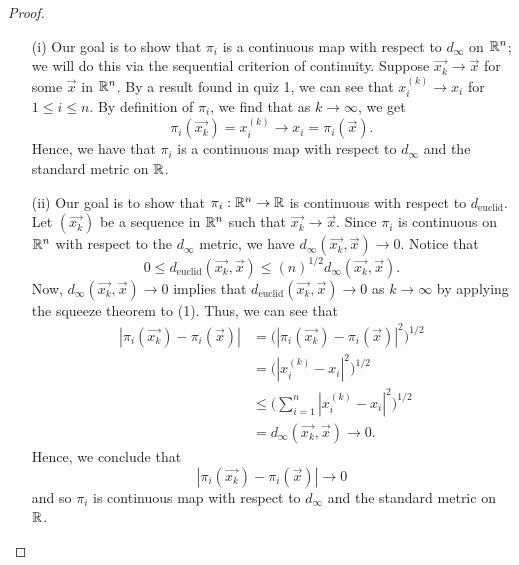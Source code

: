 \documentclass[a4paper]{article}
\begin{document}
\begin{proof}
\begin{enumerate}
    \item[(i)] Our goal is to show that \( {\pi}_{i} \) is a continuous map with respect to \( {d}_{\infty } \) on \( \mathbb{R}^{n} \); we will do this via the sequential criterion of continuity. Suppose \( \vec{ {x}_{k} }  \to \vec{ x }  \) for some \( \vec{ x }  \) in \( \mathbb{R}^{n} \). By a result found in quiz 1, we can see that \( {x}_{i}^{(k)} \to {x}_{i} \) for \( 1 \leq i \leq n  \). By definition of \( {\pi}_{i} \), we find that as \( k \to \infty  \), we get
        \[ {\pi}_{i}(\vec{ x_{k} } ) = {x}_{i}^{(k)} \to {x}_{i} = {\pi}_{i}(\vec{ x } ).  \]
        Hence, we have that \( {\pi}_{i} \) is a continuous map with respect to \( {d}_{\infty } \) and the standard metric on \( \mathbb{R}  \).
    \item[(ii)] Our goal is to show that \( {\pi}_{i}: \mathbb{R}^{n} \to \mathbb{R}  \) is continuous with respect to \( {d}_{\text{euclid}}  \). Let \( (\vec{ {x}_{k} } )\) be a sequence in \( \mathbb{R}^{n} \) such that \( \vec{ {x}_{k} } \to \vec{ x }    \). Since \( {\pi}_{i} \) is continuous on \( \mathbb{R}^{n} \) with respect to the \( {d}_{\infty }  \) metric, we have \( {d}_{\infty }(\vec{ {x}_{k} }, \vec{ x } ) \to 0 \). Notice that 
        \[  0 \leq {d}_{\text{euclid}}(\vec{ {x}_{k} } , \vec{ x } ) \leq (n)^{1/2} {d}_{\infty }(\vec{ {x}_{k} } , \vec{ x } ). \tag{1} \]
        Now, \( {d}_{\infty }(\vec{ {x}_{k}}, \vec{ x }  ) \to 0  \) implies that \( {d}_{\text{euclid}}(\vec{ {x}_{k} } , \vec{ x } ) \to 0  \) as \( k \to \infty  \) by applying the squeeze theorem to (1). Thus, we can see that  
        \begin{align*}
            | {\pi}_{i}(\vec{ {x}_{k} } ) - {\pi }_{i}(\vec{ x } )  | &= \Big( | {\pi}_{i}(\vec{ {x}_{k} } ) - {\pi}_{i}( \vec{ x }  ) |^{2} \Big)^{1/2}  \\
                                                                      &= \Big( | {x}_{i}^{(k)} - {x}_{i} |^{2}  \Big)^{1/2} \\
                                                                      &\leq \Big( \sum_{ i=1 }^{ n} | {x}_{i}^{(k)} - {x}_{i} |^{2} \Big)^{1/2} \\
                                                                      &= {d}_{\infty }(\vec{ {x}_{k} } , \vec{ x } ) \to 0. 
        \end{align*}
        Hence, we conclude that 
        \[   | {\pi}_{i}(\vec{ {x}_{k} } ) - {\pi }_{i}(\vec{ x } )  | \to 0 \]
        and so \( {\pi}_{i} \) is continuous map with respect to \( {d}_{\infty } \) and the standard metric on \( \mathbb{R}  \).
\end{enumerate}
\end{proof}
\end{document}
